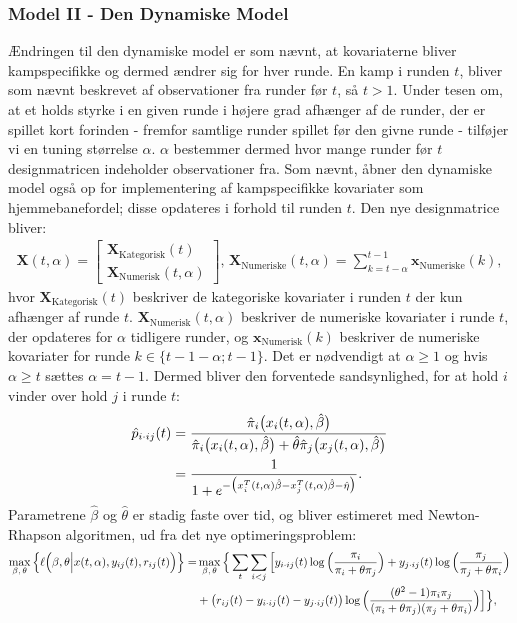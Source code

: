 \documentclass[11pt,a4paper]{article}
\begin{document}
\subsubsection{Model II - Den Dynamiske Model}
Ændringen til den dynamiske model er som nævnt, at kovariaterne bliver kampspecifikke og dermed ændrer sig for hver runde. En kamp i runden $t$, bliver som nævnt beskrevet af observationer fra runder før $t$, så $t>1$. Under tesen om, at et holds styrke i en given runde i højere grad afhænger af de runder, der er spillet kort forinden - fremfor samtlige runder spillet før den givne runde - tilføjer vi en tuning størrelse $\alpha$. $\alpha$ bestemmer dermed hvor mange runder før $t$ designmatricen indeholder observationer fra. Som nævnt, åbner den dynamiske model også op for implementering af kampspecifikke kovariater som hjemmebanefordel; disse opdateres i forhold til runden $t$. Den nye designmatrice bliver:
\begin{align*}
\textbf{X}(t,\alpha)=\begin{bmatrix}
\textbf{X}_{\text{Kategorisk}}(t)\\
\textbf{X}_{\text{Numerisk}}(t,\alpha)
\end{bmatrix}\text{,   }\textbf{X}_{\text{Numeriske}}(t,\alpha)=\sum_{k=t-\alpha}^{t-1}\textbf{x}_{\text{Numeriske}}(k),
\end{align*}
hvor $\textbf{X}_{\text{Kategorisk}}(t)$ beskriver de kategoriske kovariater i runden $t$ der kun afhænger af runde $t$. $\textbf{X}_{\text{Numerisk}}(t,\alpha)$ beskriver de numeriske kovariater i runde $t$, der opdateres for $\alpha$ tidligere runder, og $\textbf{x}_{\text{Numerisk}}(k)$ beskriver de numeriske kovariater for runde $k\in \{t-1-\alpha;t-1\}$. Det er nødvendigt at $\alpha\geq1$ og hvis $\alpha\geq t$ sættes $\alpha=t-1$.
Dermed bliver den forventede sandsynlighed, for at hold $i$ vinder over hold $j$ i runde $t$:
\begin{align*}
\hat{p}_{i\cdot ij}(t) &=\frac{\hat{\pi}_i\big{(}x_i(t,\alpha),\hat{\beta}\big{)}}{\hat{\pi}_i\big{(}x_i(t,\alpha),\hat{\beta}\big{)}+\hat{\theta}\hat{\pi}_j\big{(}x_j(t,\alpha),\hat{\beta}\big{)}}\\
&=\frac{1}{1+e^{-\big{(}x_i^T(t,\alpha)\hat{\beta}-x_j^T(t,\alpha)\hat{\beta}-\hat{\eta}\big{)}}}.
\end{align*}
Parametrene $\hat{\beta}$ og $\hat{\theta}$ er stadig faste over tid, og bliver estimeret med Newton-Rhapson algoritmen, ud fra det nye optimeringsproblem:
\begin{align*}
\max_{\beta,\,\theta} \Big{\{}\ell\Big{(}\beta,\theta\Big{|}x(t,\alpha),y_{ij}(t),r_{ij}(t)\Big{)}\Big{\}}=&\max_{\beta,\,\theta} \Big{\{} \sum_{t}\sum_{i<j}\Big{[}y_{i\cdot ij}(t)\log\Big{(}\frac{\pi_i}{\pi_i+\theta\pi_j}\Big{)}
+ y_{j\cdot ij}(t)\log\Big{(}\frac{\pi_j}{\pi_j+\theta\pi_i}\Big{)}\\
&+ \big{(}r_{ij}(t)-y_{i\cdot ij}(t)-y_{j\cdot ij}(t)\big{)} \log\Big{(}\frac{(\theta^2-1)\pi_i \pi_j}{(\pi_i+\theta\pi_j)(\pi_j+\theta\pi_i)}\Big{)}\Big{]}\Big{\}},
\end{align*}
\end{document}
